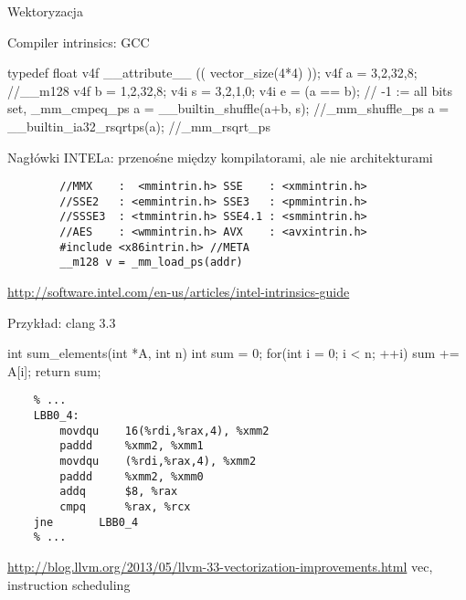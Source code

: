 \begin{frame}[fragile]{Wektoryzacja}
	\begin{block}{Compiler intrinsics: GCC}
		\begin{cpp}
			typedef float v4f __attribute__ (( vector_size(4*4) ));
			v4f a = {3,2,32,8}; //__m128
			v4f b = {1,2,32,8};
			v4i s = {3,2,1,0};
			v4i e = (a == b); // -1 := all bits set, _mm_cmpeq_ps
			a = __builtin_shuffle(a+b, s); //_mm_shuffle_ps
			a = __builtin_ia32_rsqrtps(a); //_mm_rsqrt_ps
		\end{cpp}
	\end{block}
	\begin{block}{Nagłówki INTELa: przenośne między kompilatorami, ale nie architekturami}
		\begin{verbatim}
		//MMX    :  <mmintrin.h> SSE    : <xmmintrin.h>
		//SSE2   : <emmintrin.h> SSE3   : <pmmintrin.h>
		//SSSE3  : <tmmintrin.h> SSE4.1 : <smmintrin.h>
		//AES    : <wmmintrin.h> AVX    : <avxintrin.h>
		#include <x86intrin.h> //META
		__m128 v = _mm_load_ps(addr)
		\end{verbatim}
		\url{http://software.intel.com/en-us/articles/intel-intrinsics-guide}
	\end{block}
\end{frame}
\begin{frame}[fragile]{Przykład: clang 3.3}
	\begin{cpp}
	int sum_elements(int *A, int n) {
	    int sum = 0;
	    for(int i = 0; i < n; ++i)
	        sum += A[i];
	    return sum;
	}
	\end{cpp}
	\begin{verbatim}
	% ...
	LBB0_4:
	    movdqu    16(%rdi,%rax,4), %xmm2
	    paddd     %xmm2, %xmm1
	    movdqu    (%rdi,%rax,4), %xmm2
	    paddd     %xmm2, %xmm0
	    addq      $8, %rax
	    cmpq      %rax, %rcx
	jne       LBB0_4
	% ...
	\end{verbatim}
	\tiny\url{http://blog.llvm.org/2013/05/llvm-33-vectorization-improvements.html}
	vec, instruction scheduling
\end{frame}
